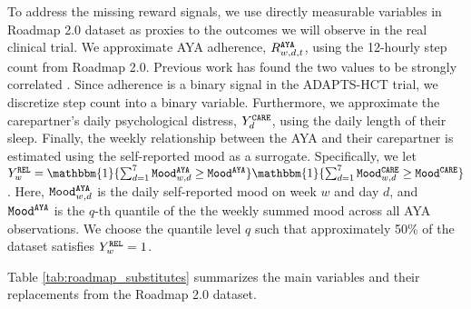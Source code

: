 To address the missing reward signals, we use directly measurable variables in Roadmap 2.0 dataset as proxies to the outcomes we will observe in the real clinical trial. We approximate AYA adherence, $R_{w,d,t}^{\tiny\texttt{AYA}}$, using the 12-hourly step count from Roadmap 2.0. Previous work has found the two values to be strongly correlated . Since adherence is a binary signal in the ADAPTS-HCT trial, we discretize step count into a binary variable. Furthermore, we approximate the carepartner's daily psychological distress, $Y_d^{\tiny\texttt{CARE}}$, using the daily length of their sleep. Finally, the weekly relationship between the AYA and their carepartner is estimated using the self-reported mood as a surrogate. Specifically, we let  $Y_w^{\EDGE} = \mathbbm{1}\{\sum_{d = 1}^{7} \Mood_{w,d}^{\AYA} \geq \Mood^{\AYA}\} \mathbbm{1}\{\sum_{d = 1}^{7}\Mood_{w,d}^{\CARE} \geq \Mood^{\CARE}\}$. Here, ${\texttt{Mood}}_{w,d}^{\tiny\texttt{AYA}}$ is the daily self-reported mood on week $w$ and day $d$, and ${\texttt{Mood}}^{\tiny\texttt{AYA}}$ is the $q$-th quantile of the the weekly summed mood across all AYA observations. We choose the quantile level $q$ such that approximately 50\% of the dataset satisfies $Y_{w}^{\tiny\texttt{REL}} = 1$.

Table \ref{tab:roadmap_substitutes} summarizes the main variables and their replacements from the Roadmap 2.0 dataset.  

\begin{table}[hpt]
    \centering
    \caption{Substitutes of the main variables from Roadmap 2.0 dataset.}
    \label{tab:roadmap_substitutes}
\end{table}


